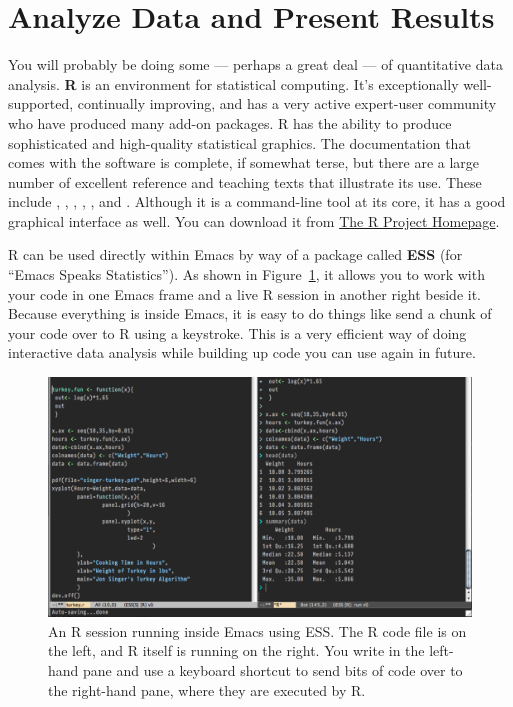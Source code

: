 \documentclass[11pt,article,oneside]{memoir}
\begin{document}
\section{Analyze Data and Present Results} 
You will probably be doing some --- perhaps a great deal --- of quantitative data analysis. \textbf{R} is an environment for statistical computing. It's exceptionally well-supported, continually improving, and has a very active expert-user community who have produced many add-on packages. R has the ability to produce sophisticated and high-quality statistical graphics. The documentation that comes with the software is complete, if somewhat terse, but there are a large number of excellent reference and teaching texts that illustrate its use. These include \citet{dalgaard02:_introd_statis_r}, \citet{venables02:_moder_applied_statis_s_plus}, \citet{maindonald03:_data_analy_graph_using_r}, \citet{fox02:_r_s_plus_compan_applied_regres}, \citet{frank01:_regres_model_strat}, and 
\citet{gelmanhill07:data_analysis}. Although it is a command-line tool at its core, it has a good graphical interface as well. You can download it from \href{http://www.r-project.org/}{The R Project Homepage}.     

R can be used directly within Emacs by way of a package called \textbf{ESS}
(for ``Emacs Speaks Statistics''). As shown in Figure~\ref{fig:ess}, it allows you to work with your code in one Emacs frame and a live R session in another right beside it. Because everything is inside Emacs, it is easy to do things like send a chunk of your code over to R using a keystroke. This is a very efficient way of doing interactive data analysis while building up code you can use again in future.  

\begin{figure}[h]
	\centering
		\includegraphics[scale=0.35]{figures/ess-r-emacs}
	\caption{An R session running inside Emacs using ESS. The R code file is on the left, and R itself is running on the right. You write in the left-hand pane and use a keyboard shortcut to send bits of code over to the right-hand pane, where they are executed by R.}
	\label{fig:ess}
\end{figure} 
\end{document}
